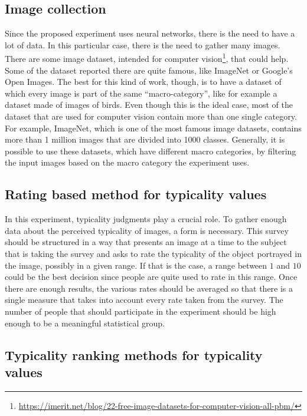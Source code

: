 \documentclass[conference]{IEEEtran}
\begin{document}
		\subsection{Image collection}
			
			\noindent Since the proposed experiment uses neural networks, there is the need to have a lot of data. In this particular case, there is the need to gather many images. There are some image dataset, intended for computer 
			vision\footnote{\url{https://imerit.net/blog/22-free-image-datasets-for-computer-vision-all-pbm/}}, that could help. Some of the dataset reported there are quite famous, like ImageNet or Google's Open Images. The 
			best for this kind of work, though, is to have a dataset of which every image is part of the same ``macro-category'', like for example a dataset made of images of birds. Even though this is the ideal case,
			most of the dataset that are used for computer vision contain more than one single category. For example, ImageNet, which is one of the most famous image datasets, contains more than 1 million images that are divided 
			into 1000 classes. Generally, it is possible to use these datasets, which have different macro categories, by filtering the input images based on the macro category the experiment uses.
		
		\subsection{Rating based method for typicality values\label{sec:typval}}
			
			\noindent In this experiment, typicality judgments play a crucial role. To gather enough data about the perceived typicality of images, a form is necessary. This survey should be structured in a way that presents an 
			image at a time to the subject that is taking the survey and asks to rate the typicality of the object portrayed in the image, possibly in a given range. If that is the case, a range between $1$ and $10$ 
			could be the best decision since people are quite used to rate in this range. Once there are enough results, the various rates should be averaged so that there is a single measure that takes into 
			account every rate taken from the survey. The number of people that should participate in the experiment should be high enough to be a meaningful statistical group.
			
		\subsection{Typicality ranking methods for typicality values}
		
\end{document}
